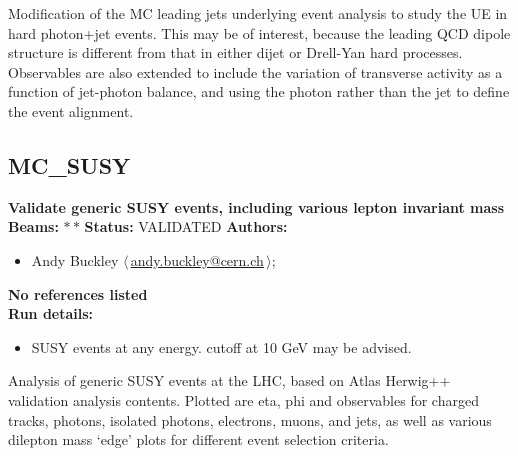\noindent Modification of the MC leading jets underlying event analysis to study the UE in hard photon+jet events. This may be of interest, because the leading QCD dipole structure is different from that in either dijet or Drell-Yan hard processes. Observables are also extended to include the variation of transverse activity as a function of jet-photon balance, and using the photon rather than the jet to define the event alignment.

\clearpage


\clearpage

\subsection{MC\_SUSY}
\textbf{Validate generic SUSY events, including various lepton invariant mass}\newline
\textbf{Beams:} $*$\,$*$ \newline
\textbf{Status:} VALIDATED\newline
\textbf{Authors:}
\begin{itemize}
  \item Andy Buckley $\langle\,$\href{mailto:andy.buckley@cern.ch}{andy.buckley@cern.ch}$\,\rangle$;
\end{itemize}
\textbf{No references listed}\\ 
\textbf{Run details:}
\begin{itemize}

  \item SUSY events at any energy. \pT cutoff at 10 GeV may be advised.\end{itemize}

\noindent Analysis of generic SUSY events at the LHC, based on Atlas Herwig++ validation analysis contents. Plotted are eta, phi and \pT observables for charged tracks, photons, isolated photons, electrons, muons, and jets, as well as various dilepton mass `edge' plots for different event selection criteria.

\clearpage


\clearpage

